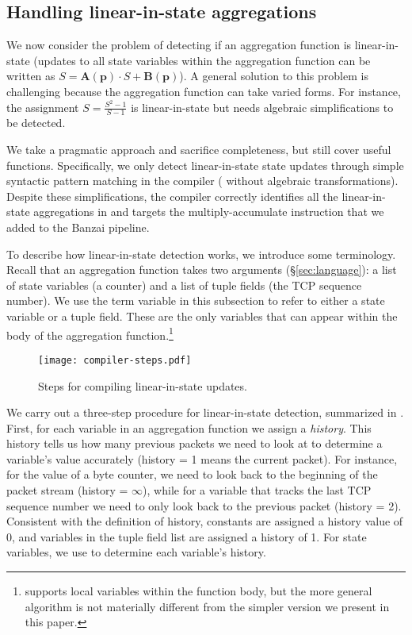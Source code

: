 \subsection{Handling linear-in-state aggregations}
\label{sec:linear-in-state-compilation}

We now consider the problem of detecting if an aggregation function is
linear-in-state (\ie updates to all state variables within the aggregation
function can be written as
$S = \boldsymbol{A}(\mathbf{p}) \cdot S + \boldsymbol{B}(\mathbf{p})$).
A general solution to
this problem is challenging because the aggregation function can take varied
forms. For instance, the assignment $S = \frac{S^2 - 1}{S -1}$ is
linear-in-state but needs algebraic simplifications to be detected.

We take a pragmatic approach and sacrifice completeness, but still cover useful
functions. Specifically, we only detect linear-in-state state updates through
simple syntactic pattern matching in the compiler (\ie 
without algebraic transformations).  Despite these simplifications, the \TheSystem
compiler correctly identifies all the linear-in-state aggregations in
 and targets the multiply-accumulate
instruction that we added to the Banzai pipeline.

To describe how linear-in-state detection works, we introduce some
terminology.  Recall that an aggregation function takes two arguments
(\S\ref{sec:language}): a list of state variables (\eg a counter) and a list of
tuple fields (\eg the TCP sequence number). We use the term variable in this
subsection to refer to either a state variable or a tuple field. These are the only variables that can appear within the body
of the aggregation function.\footnote{\TheSystem supports local variables within
  the function body, but the more general algorithm is not materially
  different from the simpler version we present in this paper.}

\begin{figure}
\centering
\texttt{[image: compiler-steps.pdf]}
\caption{Steps for compiling linear-in-state updates.}
\label{fig:compiler-steps}
\end{figure}

We carry out a three-step procedure for linear-in-state
detection, summarized in .  First, for each variable in an
aggregation function we assign a {\em history}.  This history tells us how many
previous packets we need to look at to determine a variable's value accurately
(history = 1 means the current packet). For instance, for the value of a byte
counter, we need to look back to the beginning of the packet stream (history =
$\infty$), while for a variable that tracks the last TCP sequence number
we need to only look back to the previous packet (history = 2). Consistent with
the definition of history, constants are assigned a history value of 0, and
variables in the tuple field list are assigned a history of 1. For state
variables, we use  to determine each variable's history.

